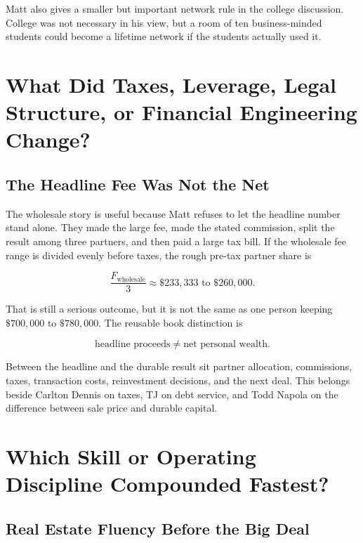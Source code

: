 \documentclass[11pt,oneside]{book}
\begin{document}
Matt also gives a smaller but important network rule in the college discussion. College was not necessary in his view, but a room of ten business-minded students could become a lifetime network if the students actually used it.

\chapter{What Did Taxes, Leverage, Legal Structure, or Financial Engineering Change?}

\section{The Headline Fee Was Not the Net}

The wholesale story is useful because Matt refuses to let the headline number stand alone. They made the large fee, made the stated commission, split the result among three partners, and then paid a large tax bill. If the wholesale fee range is divided evenly before taxes, the rough pre-tax partner share is

\begin{equation}
\frac{F_{\text{wholesale}}}{3}
\approx
\$233{,}333\text{ to }\$260{,}000.
\end{equation}

That is still a serious outcome, but it is not the same as one person keeping \(\$700{,}000\) to \(\$780{,}000\). The reusable book distinction is

\begin{equation}
\text{headline proceeds}
\neq
\text{net personal wealth}.
\end{equation}

Between the headline and the durable result sit partner allocation, commissions, taxes, transaction costs, reinvestment decisions, and the next deal. This belongs beside Carlton Dennis on taxes, TJ on debt service, and Todd Napola on the difference between sale price and durable capital.

\chapter{Which Skill or Operating Discipline Compounded Fastest?}

\section{Real Estate Fluency Before the Big Deal}
\end{document}
